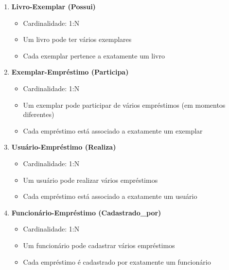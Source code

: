 \documentclass[12pt,a4paper]{article}
\begin{document}
\begin{tcolorbox}[title=Relacionamentos do Sistema]
\begin{enumerate}[label=\textbf{R\arabic*.}]
    \item \textbf{Livro-Exemplar (Possui)}
    \begin{itemize}
        \item Cardinalidade: 1:N
        \item Um livro pode ter vários exemplares
        \item Cada exemplar pertence a exatamente um livro
    \end{itemize}

    \item \textbf{Exemplar-Empréstimo (Participa)}
    \begin{itemize}
        \item Cardinalidade: 1:N
        \item Um exemplar pode participar de vários empréstimos (em momentos diferentes)
        \item Cada empréstimo está associado a exatamente um exemplar
    \end{itemize}

    \item \textbf{Usuário-Empréstimo (Realiza)}
    \begin{itemize}
        \item Cardinalidade: 1:N
        \item Um usuário pode realizar vários empréstimos
        \item Cada empréstimo está associado a exatamente um usuário
    \end{itemize}

    \item \textbf{Funcionário-Empréstimo (Cadastrado\_por)}
    \begin{itemize}
        \item Cardinalidade: 1:N
        \item Um funcionário pode cadastrar vários empréstimos
        \item Cada empréstimo é cadastrado por exatamente um funcionário
    \end{itemize}
\end{enumerate}
\end{tcolorbox}
\end{document}
